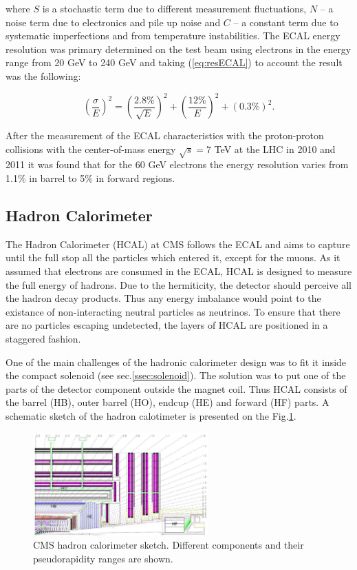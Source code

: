 where $S$ is a stochastic term due to different measurement fluctuations, $N$ -- a noise term due to electronics and pile up noise
and $C$ -- a constant term due to systematic imperfections and from temperature instabilities. 
The ECAL energy resolution was primary determined on the test beam using 
electrons in the energy range from 20 GeV to 240 GeV\cite{ECALres2007} and taking (\ref{eq:resECAL}) to account the result was the
following:

\begin{equation}\label{eq:resECAL}
  (\frac{\sigma}{E})^{2} = (\frac{2.8\%}{\sqrt{E}})^{2} + (\frac{12\%}{E})^{2} + (0.3\%)^{2}.
\end{equation}

After the measurement of the ECAL characteristics with the proton-proton collisions with the center-of-mass energy $\sqrt{s} = $7 TeV
at the LHC in 2010 and 2011 it was found that for the 60 GeV electrons the energy resolution varies from 1.1$\%$ in barrel to 5$\%$ in 
forward regions\cite{ECALres2013}.

\subsection{Hadron Calorimeter}

The Hadron Calorimeter (HCAL)\cite{CMSatLHC} at CMS follows the ECAL and aims to capture until the full stop all the particles which entered it, 
except for the muons. As it assumed that electrons are consumed in the ECAL, HCAL is designed to measure the full energy of hadrons. 
Due to the hermiticity, the detector should perceive all the hadron decay products. Thus any energy imbalance would point to the
existance of non-interacting neutral particles as neutrinos. To ensure that there are no particles escaping undetected, the layers
of HCAL are positioned in a staggered fashion.

One of the main challenges of the hadronic calorimeter design was to fit it inside the compact solenoid (see sec.\ref{ssec:solenoid}).
The solution was to put one of the parts of the detector component outside the magnet coil. Thus HCAL consists of the barrel (HB), 
outer barrel (HO), endcup (HE) and forward (HF) parts. A schematic sketch of the hadron calotimeter is presented on the Fig.\ref{fig:hcal}.

\begin{figure}[t]
  \centering
  \includegraphics[width=0.6\textwidth]{02_experimental_setup/plots/Figures_Experimental_Apparatus_HCAL.png}
  \caption{CMS hadron calorimeter sketch. Different components and their pseudorapidity ranges are shown.}
  \label{fig:hcal}
\end{figure}

